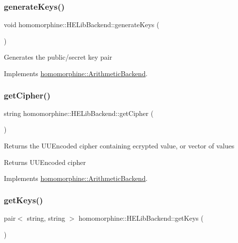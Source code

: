 \subsubsection{\texorpdfstring{generateKeys()}{generateKeys()}}
{\footnotesize\ttfamily void homomorphine\+::\+H\+E\+Lib\+Backend\+::generate\+Keys (\begin{DoxyParamCaption}{ }\end{DoxyParamCaption})\hspace{0.3cm}{\ttfamily [virtual]}}

Generates the public/secret key pair 

Implements \mbox{\hyperlink{classhomomorphine_1_1_arithmetic_backend_a5faa0089b80be5629d4a0a7a02fe3568}{homomorphine\+::\+Arithmetic\+Backend}}.

\mbox{\label{classhomomorphine_1_1_h_e_lib_backend_a9ba4311289e3b8c47f389f4f44de7d5d}} 
\subsubsection{\texorpdfstring{getCipher()}{getCipher()}}
{\footnotesize\ttfamily string homomorphine\+::\+H\+E\+Lib\+Backend\+::get\+Cipher (\begin{DoxyParamCaption}{ }\end{DoxyParamCaption})\hspace{0.3cm}{\ttfamily [virtual]}}

Returns the U\+U\+Encoded cipher containing ecrypted value, or vector of values

\begin{DoxyReturn}{Returns}
U\+U\+Encoded cipher 
\end{DoxyReturn}


Implements \mbox{\hyperlink{classhomomorphine_1_1_arithmetic_backend_acf38918fb556703ccb12b63dc73b15ed}{homomorphine\+::\+Arithmetic\+Backend}}.

\mbox{\label{classhomomorphine_1_1_h_e_lib_backend_ab45838cc01a4e71425e2aa0279e12c0e}} 
\subsubsection{\texorpdfstring{getKeys()}{getKeys()}}
{\footnotesize\ttfamily pair$<$ string, string $>$ homomorphine\+::\+H\+E\+Lib\+Backend\+::get\+Keys (\begin{DoxyParamCaption}{ }\end{DoxyParamCaption})\hspace{0.3cm}{\ttfamily [virtual]}}

